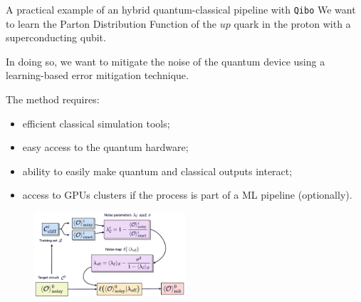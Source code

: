 \documentclass[aspectratio=169, 8pt, xcolor={svgnames}, hyperref={linkcolor=black}]{beamer}
\begin{document}
\begin{frame}{A practical example of an hybrid quantum-classical pipeline with \texttt{Qibo}}
We want to learn the Parton Distribution Function of the $up$ quark in the proton with a superconducting qubit.

In doing so, we want to mitigate the noise of the quantum device using a learning-based error mitigation technique.

\begin{multicols}{2}
The method requires:
\begin{itemize}[noitemsep]
\item[1.] efficient classical simulation tools;
\item[2.] easy access to the quantum hardware;
\item[3.] ability to easily make quantum and classical outputs interact;
\item[4.] access to GPUs clusters if the process is part of a ML pipeline (optionally). 
\end{itemize}
\begin{figure}
   \includegraphics[width=0.5\textwidth]{figures/ics.pdf}
\end{figure}
\end{multicols}
\end{frame}
\end{document}
